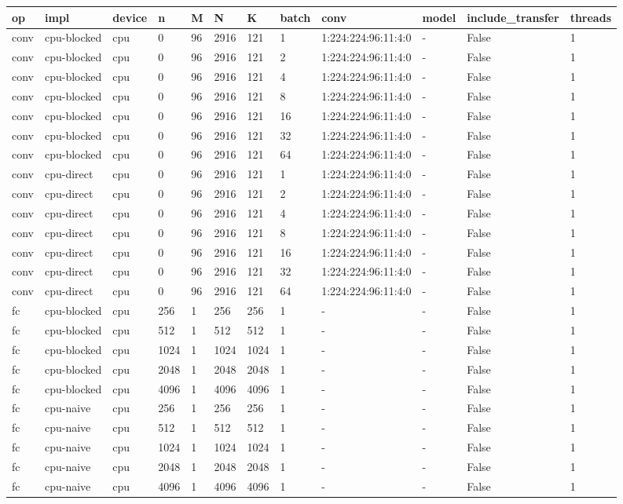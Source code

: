 \begin{tabular}{llllllllllll}
\hline
op & impl & device & n & M & N & K & batch & conv & model & include\_transfer & threads \\
\hline
conv & cpu-blocked & cpu & 0 & 96 & 2916 & 121 & 1 & 1:224:224:96:11:4:0 & - & False & 1 \\
conv & cpu-blocked & cpu & 0 & 96 & 2916 & 121 & 2 & 1:224:224:96:11:4:0 & - & False & 1 \\
conv & cpu-blocked & cpu & 0 & 96 & 2916 & 121 & 4 & 1:224:224:96:11:4:0 & - & False & 1 \\
conv & cpu-blocked & cpu & 0 & 96 & 2916 & 121 & 8 & 1:224:224:96:11:4:0 & - & False & 1 \\
conv & cpu-blocked & cpu & 0 & 96 & 2916 & 121 & 16 & 1:224:224:96:11:4:0 & - & False & 1 \\
conv & cpu-blocked & cpu & 0 & 96 & 2916 & 121 & 32 & 1:224:224:96:11:4:0 & - & False & 1 \\
conv & cpu-blocked & cpu & 0 & 96 & 2916 & 121 & 64 & 1:224:224:96:11:4:0 & - & False & 1 \\
conv & cpu-direct & cpu & 0 & 96 & 2916 & 121 & 1 & 1:224:224:96:11:4:0 & - & False & 1 \\
conv & cpu-direct & cpu & 0 & 96 & 2916 & 121 & 2 & 1:224:224:96:11:4:0 & - & False & 1 \\
conv & cpu-direct & cpu & 0 & 96 & 2916 & 121 & 4 & 1:224:224:96:11:4:0 & - & False & 1 \\
conv & cpu-direct & cpu & 0 & 96 & 2916 & 121 & 8 & 1:224:224:96:11:4:0 & - & False & 1 \\
conv & cpu-direct & cpu & 0 & 96 & 2916 & 121 & 16 & 1:224:224:96:11:4:0 & - & False & 1 \\
conv & cpu-direct & cpu & 0 & 96 & 2916 & 121 & 32 & 1:224:224:96:11:4:0 & - & False & 1 \\
conv & cpu-direct & cpu & 0 & 96 & 2916 & 121 & 64 & 1:224:224:96:11:4:0 & - & False & 1 \\
fc & cpu-blocked & cpu & 256 & 1 & 256 & 256 & 1 & - & - & False & 1 \\
fc & cpu-blocked & cpu & 512 & 1 & 512 & 512 & 1 & - & - & False & 1 \\
fc & cpu-blocked & cpu & 1024 & 1 & 1024 & 1024 & 1 & - & - & False & 1 \\
fc & cpu-blocked & cpu & 2048 & 1 & 2048 & 2048 & 1 & - & - & False & 1 \\
fc & cpu-blocked & cpu & 4096 & 1 & 4096 & 4096 & 1 & - & - & False & 1 \\
fc & cpu-naive & cpu & 256 & 1 & 256 & 256 & 1 & - & - & False & 1 \\
fc & cpu-naive & cpu & 512 & 1 & 512 & 512 & 1 & - & - & False & 1 \\
fc & cpu-naive & cpu & 1024 & 1 & 1024 & 1024 & 1 & - & - & False & 1 \\
fc & cpu-naive & cpu & 2048 & 1 & 2048 & 2048 & 1 & - & - & False & 1 \\
fc & cpu-naive & cpu & 4096 & 1 & 4096 & 4096 & 1 & - & - & False & 1 \\
\hline
\end{tabular}
